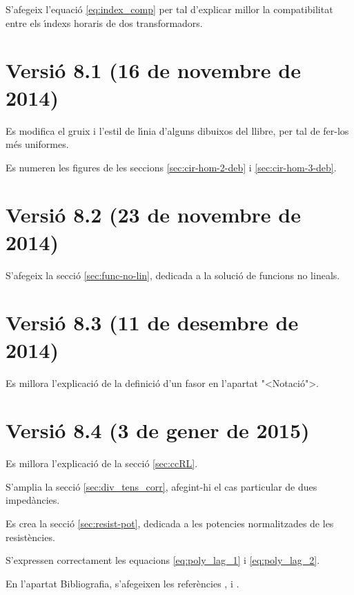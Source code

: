 S'afegeix l'equaci\'{o} \eqref{eq:index_comp} per tal d'explicar millor la compatibilitat entre els \'{\i}ndexs horaris de dos transformadors.

\section*{Versi\'{o} 8.1 (16 de novembre de 2014)}

Es modifica el gruix i l'estil de l\'{\i}nia d'alguns dibuixos del llibre, per tal de fer-los m\'{e}s uniformes.

Es numeren les figures de les seccions \ref{sec:cir-hom-2-deb} i  \ref{sec:cir-hom-3-deb}.


\section*{Versi\'{o} 8.2 (23 de novembre de 2014)}

S'afegeix la secci\'{o} \ref{sec:func-no-lin}, dedicada a la soluci\'{o} de funcions no lineals.

\section*{Versi\'{o} 8.3 (11 de desembre de 2014)}

Es millora l'explicaci\'{o} de la definici\'{o} d'un fasor en l'apartat {"<}Notaci\'{o}{">}.


\section*{Versi\'{o} 8.4 (3 de gener de 2015)}

Es millora l'explicaci\'{o} de la secci\'{o} \ref{sec:ccRL}.

S'amplia la secci\'{o} \ref{sec:div_tens_corr}, afegint-hi el cas particular de dues imped\`{a}ncies.

Es crea la secci\'{o} \ref{sec:resist-pot}, dedicada a les potencies normalitzades de les resist\`{e}ncies.

S'expressen correctament les equacions \eqref{eq:poly_lag_1} i \eqref{eq:poly_lag_2}.

En l'apartat Bibliografia, s'afegeixen les refer\`{e}ncies \cite{AGVS}, \cite{JSch} i \cite{RRop}.

